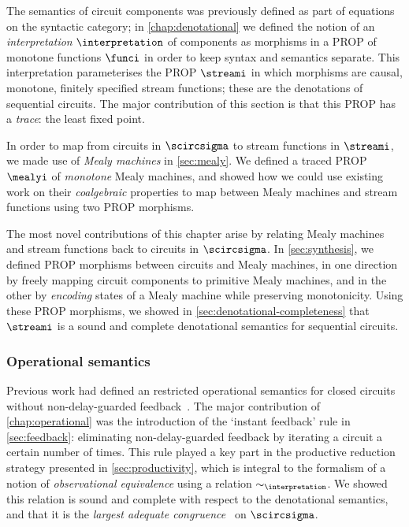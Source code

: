 The semantics of circuit components was previously defined as part of
equations on the syntactic category; in \cref{chap:denotational} we defined the
notion of an \emph{interpretation} \(\interpretation\) of components as
morphisms in a PROP of monotone functions \(\funci\) in order to keep syntax and
semantics separate.
This interpretation parameterises the PROP \(\streami\) in which morphisms are
causal, monotone, finitely specified stream functions; these are the denotations
of sequential circuits.
The major contribution of this section is that this PROP has a \emph{trace}: the
least fixed point.

In order to map from circuits in \(\scircsigma\) to stream functions in
\(\streami\), we made use of \emph{Mealy machines} in \cref{sec:mealy}.
We defined a traced PROP \(\mealyi\) of \emph{monotone} Mealy machines, and
showed how we could use existing work on their \emph{coalgebraic} properties
to map between Mealy machines and stream functions using two PROP morphisms.

The most novel contributions of this chapter arise by relating Mealy machines
and stream functions back to circuits in \(\scircsigma\).
In \cref{sec:synthesis}, we defined PROP morphisms between circuits and
Mealy machines, in one direction by freely mapping circuit components to
primitive Mealy machines, and in the other by \emph{encoding} states of a
Mealy machine while preserving monotonicity.
Using these PROP morphisms, we showed in \cref{sec:denotational-completeness}
that \(\streami\) is a sound and complete denotational semantics for sequential
circuits.

\subsubsection{Operational semantics}

Previous work had defined an restricted operational semantics for closed
circuits without non-delay-guarded feedback~\cite{ghica2017diagrammatic}.
The major contribution of \cref{chap:operational} was the introduction of the
`instant feedback' rule in \cref{sec:feedback}: eliminating non-delay-guarded
feedback by iterating a circuit a certain number of times.
This rule played a key part in the productive reduction strategy presented in
\cref{sec:productivity}, which is integral to the formalism of a notion
of \emph{observational equivalence} using a relation \(\sim_\interpretation\).
We showed this relation is sound and complete with respect to the
denotational semantics, and that it is the
\emph{largest adequate congruence}~\cite{morris1969lambdacalculus,gordon1980denotational}
on \(\scircsigma\).

